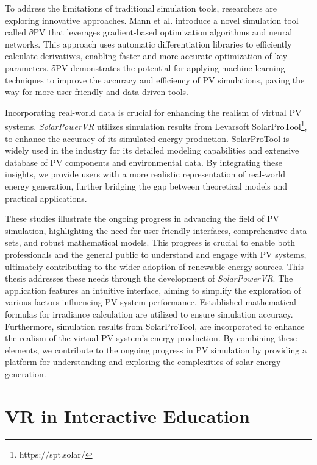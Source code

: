 \documentclass[draft, final]{vutinfth} %
\begin{document}
To address the limitations of traditional simulation tools, researchers are exploring innovative approaches. Mann et al. \cite{Mann2022deltaPV} introduce a novel simulation tool called ∂PV that leverages gradient-based optimization algorithms and neural networks. This approach uses automatic differentiation libraries to efficiently calculate derivatives, enabling faster and more accurate optimization of key parameters. ∂PV demonstrates the potential for applying machine learning techniques to improve the accuracy and efficiency of PV simulations, paving the way for more user-friendly and data-driven tools.


Incorporating real-world data is crucial for enhancing the realism of virtual PV systems. \textit{SolarPowerVR} utilizes simulation results from Levarsoft SolarProTool\footnote{https://spt.solar/}, to enhance the accuracy of its simulated energy production. SolarProTool is widely used in the industry for its detailed modeling capabilities and extensive database of PV components and environmental data. By integrating these insights, we provide users with a more realistic representation of real-world energy generation, further bridging the gap between theoretical models and practical applications.

These studies illustrate the ongoing progress in advancing the field of PV simulation, highlighting the need for user-friendly interfaces, comprehensive data sets, and robust mathematical models. This progress is crucial to enable both professionals and the general public to understand and engage with PV systems, ultimately contributing to the wider adoption of renewable energy sources. This thesis addresses these needs through the development of \textit{SolarPowerVR}. The application features an intuitive interface, aiming to simplify the exploration of various factors influencing PV system performance. Established mathematical formulas for irradiance calculation are utilized to ensure simulation accuracy. Furthermore, simulation results from SolarProTool, are incorporated to enhance the realism of the virtual PV system's energy production. By combining these elements, we contribute to the ongoing progress in PV simulation by providing a platform for understanding and exploring the complexities of solar energy generation.

\section{VR in Interactive Education}
\end{document}
